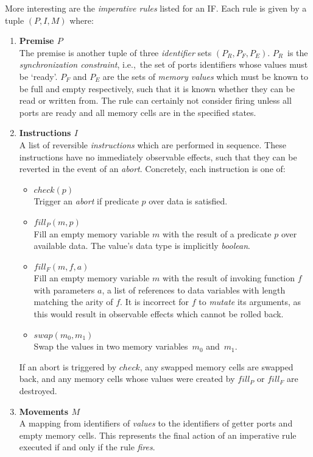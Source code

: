 More interesting are the \textit{imperative rules} listed for an IF. Each rule is given by a tuple $(P,I,M)$ where:
\begin{enumerate}
	\item \textbf{Premise $P$}\\
	The premise is another tuple of three \textit{identifier} sets $(P_R, P_F, P_E)$. $P_R$~is the \textit{synchronization constraint}, i.e.,\ the set of ports identifiers whose values must be `ready'. $P_F$ and $P_E$ are the sets of \textit{memory values} which must be known to be full and empty respectively, such that it is known whether they can be read or written from. The rule can certainly not consider firing unless all ports are ready and all memory cells are in the specified states.
	
	\item \textbf{Instructions $I$}\\
	A list of reversible \textit{instructions} which are performed in sequence. These instructions have no immediately observable effects, such that they can be reverted in the event of an \textit{abort}. Concretely, each instruction is one of:
	\begin{itemize}
		\item $check(p)$\\
		Trigger an \textit{abort} if predicate $p$ over data is satisfied.
		\item $fill_P(m, p)$\\Fill an empty memory variable $m$ with the result of a predicate $p$ over available data. The value's data type is implicitly \textit{boolean}.
		\item $fill_F(m, f, a)$\\
		Fill an empty memory variable $m$ with the result of invoking function $f$ with parameters $a$, a list of references to data variables with length matching the arity of $f$. It is incorrect for $f$ to \textit{mutate} its arguments, as this would result in observable effects which cannot be rolled back.
		\item $swap(m_0,m_1)$\\
		Swap the values in two memory variables~$m_0$ and~$m_1$.
	\end{itemize}
	If an abort is triggered by $check$, any swapped memory cells are swapped back, and any memory cells whose values were created by $fill_P$ or $fill_F$ are destroyed.
	
	\item \textbf{Movements $M$}\\
	A mapping from identifiers of \textit{values} to the identifiers of getter ports and empty memory cells. This represents the final action of an imperative rule executed if and only if the rule \textit{fires}.
\end{enumerate}

